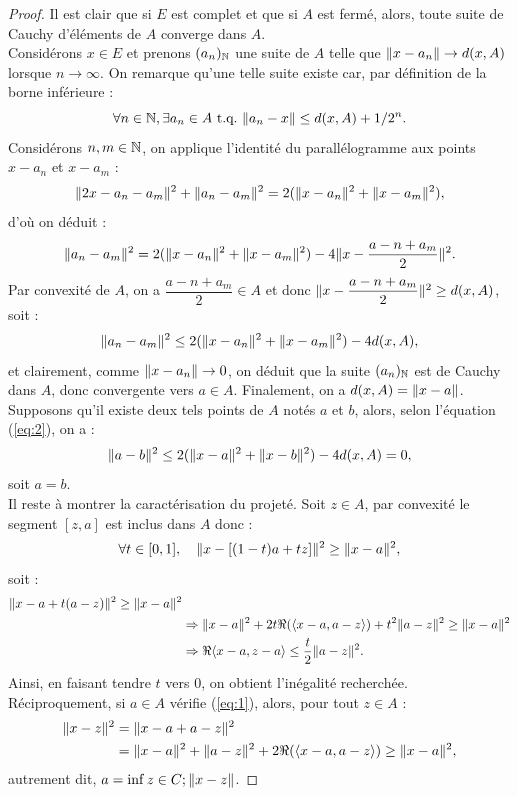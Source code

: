 \begin{proof}
Il est clair que si $E$ est complet et que si $A$ est fermé, alors, toute suite de Cauchy d'éléments de $A$ converge dans $A$. \\

Considérons $x \in E$ et prenons $(a_n)_{\mathbb{N}}$ une suite de $A$ telle que $\lVert x-a_n\rVert \to d(x,A)$ lorsque $n \to \infty$. 
On remarque qu'une telle suite existe car, par définition de la borne inférieure :
\[ \forall n \in \mathbb{N}, \exists a_n \in A \text{~t.q.~} \lVert a_n-x\rVert \leq d(x,A) + 1/2^n . \]
Considérons $n, m \in \mathbb{N}$, on applique l'identité du parallélogramme aux points $x-a_n$ et $x-a_m$ : 
\[ \lVert2x- a_n - a_m\rVert^2 + \lVert a_n - a_m\rVert^2 = 2(\lVert x-a_n\rVert^2 + \lVert x-a_m\rVert^2) , \]
d'où on déduit :
\[ \lVert a_n-a_m\rVert^2 = 2(\lVert x-a_n\rVert^2 + \lVert x-a_m\rVert^2) - 4 \lVert x - \dfrac{a-n+a_m}{2}\rVert^2 . \]
Par convexité de $A$, on a $\dfrac{a-n+a_m}{2} \in A$ et donc $\lVert x - \dfrac{a-n+a_m}{2} \rVert^2 \geq d(x,A)$, soit :
\begin{equation}
\lVert a_n-a_m\rVert^2 \leq 2(\lVert x-a_n\rVert^2 + \lVert x-a_m\rVert^2) - 4 d(x,A) , \label{eq:2} 
\end{equation}
et clairement, comme $\lVert x-a_n\rVert \to 0$, on déduit que la suite $(a_n)_{\mathbb{N}}$ est de Cauchy dans $A$, donc convergente vers $a \in A$.
Finalement, on a $d(x,A) = \lVert x-a\rVert$. \\

Supposons qu'il existe deux tels points de $A$ notés $a$ et $b$, alors, selon l'équation (\ref{eq:2}), on a :
\[ \lVert a-b\rVert^2 \leq 2(\lVert x-a\rVert^2 + \lVert x-b\rVert^2) - 4 d(x,A) = 0 , \]
soit $a=b$. \\

Il reste à montrer la caractérisation du projeté. Soit $z \in A$, par convexité le segment $[z,a]$ est inclus dans $A$ donc :
\[ \forall t \in [0,1], \quad \lVert x-[(1-t)a+tz]\rVert^2 \geq \lVert x-a\rVert^2 , \]
soit :
\begin{align*}
\lVert x-a+t(a-z)\rVert^2 \geq \lVert x-a\rVert^2 & \\
& \Rightarrow \lVert x-a\rVert^2 + 2t \Re(\langle x-a,a-z\rangle) + t^2 \lVert a-z\rVert^2 \geq \lVert x-a\rVert^2 \\
& \Rightarrow \Re{\langle x-a,z-a\rangle} \leq \dfrac{t}2 \lVert a-z\rVert^2 .
\end{align*}
Ainsi, en faisant tendre $t$ vers 0, on obtient l'inégalité recherchée. \\
Réciproquement, si $a \in A$ vérifie (\ref{eq:1}), alors, pour tout $z \in A$ : 
\begin{align*}
\lVert x-z\rVert^2 & = \lVert x-a + a - z\rVert^2 \\
& = \lVert x-a\rVert^2 + \lVert a-z\rVert^2 + 2 \Re(\langle x-a, a-z\rangle) \geq \lVert x-a\rVert^2 ,
\end{align*}
autrement dit, $a = \inf{z \in C ; \lVert x-z\rVert }$.
\end{proof}

